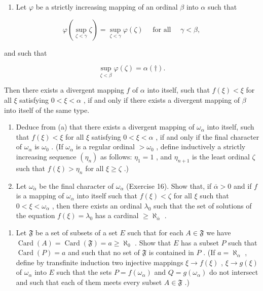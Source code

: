 \begin{enumerate}
\def\labelenumi{(\alph{enumi})}
\tightlist
\item
  Let \(\varphi\) be a strictly increasing mapping of an ordinal \(\beta\) into \(\alpha\) such that
\end{enumerate}

\[
\varphi (\sup _ {\zeta <   \gamma} \zeta) = \sup _ {\zeta <   \gamma} \varphi (\zeta) \quad \text { for   all } \quad \gamma <   \beta ,
\]

and such that

\[
\sup _ {\zeta <   \beta} \varphi (\zeta) = \alpha (\dagger).
\]

Then there exists a divergent mapping \(f\) of \(\alpha\) into itself, such that \(f(\xi) < \xi\) for all \(\xi\) satisfying \(0 < \xi < \alpha\) , if and only if there exists a divergent mapping of \(\beta\) into itself of the same type.

\begin{enumerate}
\def\labelenumi{(\alph{enumi})}
\setcounter{enumi}{1}
\item
  Deduce from (a) that there exists a divergent mapping of \(\omega_{\alpha}\) into itself, such that \(f(\xi) < \xi\) for all \(\xi\) satisfying \(0 < \xi < \alpha\) , if and only if the final character of \(\omega_{\alpha}\) is \(\omega_0\) . (If \(\omega_{\alpha}\) is a regular ordinal \(> \omega_0\) , define inductively a strictly increasing sequence \((\eta_n)\) as follows: \(\eta_1 = 1\) , and \(\eta_{n+1}\) is the least ordinal \(\zeta\) such that \(f(\xi) > \eta_n\) for all \(\xi \geqslant \zeta\) .)
\item
  Let \(\omega_{\overline{\alpha}}\) be the final character of \(\omega_{\alpha}\) (Exercise 16). Show that, if \(\overline{\alpha} > 0\) and if \(f\) is a mapping of \(\omega_{\alpha}\) into itself such that \(f(\xi) < \zeta\) for all \(\xi\) such that \(0 < \xi < \omega_{\alpha}\) , then there exists an ordinal \(\lambda_0\) such that the set of solutions of the equation \(f(\xi) = \lambda_0\) has a cardinal \(\geqslant \aleph_{\overline{\alpha}}\) .
\end{enumerate}

\begin{enumerate}
\def\labelenumi{\arabic{enumi}.}
\setcounter{enumi}{23}
\tightlist
\item
  Let \(\mathfrak{F}\) be a set of subsets of a set \(E\) such that for each \(A \in \mathfrak{F}\) we have \(\operatorname{Card}(A) = \operatorname{Card}(\mathfrak{F}) = a \geqslant \aleph_0\) . Show that \(E\) has a subset \(P\) such that \(\operatorname{Card}(P) = a\) and such that no set of \(\mathfrak{F}\) is contained in \(P\) . (If \(a = \aleph_{\alpha}\) , define by transfinite induction two injective mappings \(\xi \to f(\xi)\) , \(\xi \to g(\xi)\) of \(\omega_{\alpha}\) into \(E\) such that the sets \(P = f(\omega_{\alpha})\) and \(Q = g(\omega_{\alpha})\) do not intersect and such that each of them meets every subset \(A \in \mathfrak{F}\) .)
\end{enumerate}

